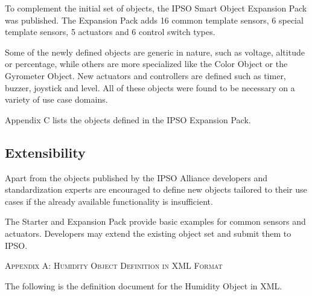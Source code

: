 \documentclass[peerreview, a4paper, 7pt]{IEEEtran}
\begin{document}
To complement the initial set of objects, the IPSO Smart Object Expansion Pack was published. The Expansion Pack adds 16 common template sensors, 6 special template sensors, 5 actuators and 6 control switch types.  

Some of the newly defined objects are generic in nature, such as voltage, altitude or percentage, while others are more specialized like the Color Object or the Gyrometer Object. New actuators and controllers are defined such as timer, buzzer, joystick and level. All of these objects were found to be necessary on a variety of use case domains.

Appendix C lists the objects defined in the IPSO Expansion Pack. 

\subsection{Extensibility}

Apart from the objects published by the IPSO Alliance developers and standardization experts are encouraged to define new objects tailored to their use cases if the already available functionality is insufficient. %

The Starter and Expansion Pack provide basic examples for common sensors and actuators. Developers may extend the existing object set and submit them to IPSO. %


% 



\appendix
\label{appendix_a}

\textsc{Appendix A: Humidity Object Definition in XML Format}

The following is the definition document for the Humidity Object in XML.
\end{document}
